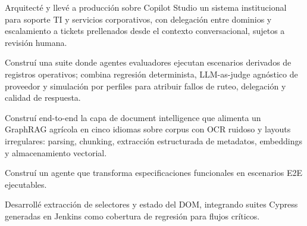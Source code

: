 \documentclass[10pt,a4paper]{article}
\begin{document}


\begin{cvitems}
  \item {} Arquitecté y llevé a producción sobre Copilot Studio un sistema
  institucional para soporte TI y servicios corporativos, con delegación entre dominios y escalamiento a tickets
  prellenados desde el contexto conversacional, sujetos a revisión humana.
  \item {} Construí una suite donde agentes evaluadores ejecutan escenarios derivados
  de registros operativos; combina regresión determinista, LLM-as-judge agnóstico de proveedor y simulación por perfiles
  para atribuir fallos de ruteo, delegación y calidad de respuesta.
  \item {} Construí end-to-end la capa de document intelligence que alimenta un GraphRAG
  agrícola en cinco idiomas sobre corpus con OCR ruidoso y layouts irregulares: parsing, chunking, extracción estructurada
  de metadatos, embeddings y almacenamiento vectorial.
\end{cvitems}

\begin{cvitems}
  \item {} Construí un agente que transforma especificaciones funcionales en escenarios
  E2E ejecutables.
  \item {} Desarrollé extracción de selectores y estado del DOM, integrando suites Cypress
  generadas en Jenkins como cobertura de regresión para flujos críticos.
\end{cvitems}

\end{document}
